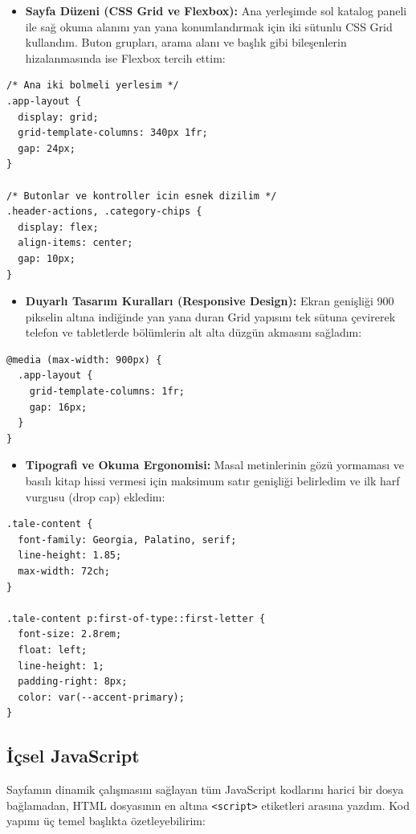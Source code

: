 \documentclass[12pt,a4paper]{article}
\begin{document}
\begin{itemize}
\item \textbf{Sayfa Düzeni (CSS Grid ve Flexbox):} Ana yerleşimde sol katalog paneli ile sağ okuma alanını yan yana konumlandırmak için iki sütunlu CSS Grid kullandım. Buton grupları, arama alanı ve başlık gibi bileşenlerin hizalanmasında ise Flexbox tercih ettim:
\end{itemize}

\begin{lstlisting}[caption={Grid ve Flexbox Yerlesimi}]
/* Ana iki bolmeli yerlesim */
.app-layout {
  display: grid;
  grid-template-columns: 340px 1fr;
  gap: 24px;
}

/* Butonlar ve kontroller icin esnek dizilim */
.header-actions, .category-chips {
  display: flex;
  align-items: center;
  gap: 10px;
}
\end{lstlisting}

\begin{itemize}
\item \textbf{Duyarlı Tasarım Kuralları (Responsive Design):} Ekran genişliği 900 pikselin altına indiğinde yan yana duran Grid yapısını tek sütuna çevirerek telefon ve tabletlerde bölümlerin alt alta düzgün akmasını sağladım:
\end{itemize}

\begin{lstlisting}[caption={Mobil ve Tablet Uyumlu Media Query}]
@media (max-width: 900px) {
  .app-layout {
    grid-template-columns: 1fr;
    gap: 16px;
  }
}
\end{lstlisting}

\begin{itemize}
\item \textbf{Tipografi ve Okuma Ergonomisi:} Masal metinlerinin gözü yormaması ve basılı kitap hissi vermesi için maksimum satır genişliği belirledim ve ilk harf vurgusu (drop cap) ekledim:
\end{itemize}

\begin{lstlisting}[caption={Tipografi ve İlk Harf Vurgusu}]
.tale-content {
  font-family: Georgia, Palatino, serif;
  line-height: 1.85;
  max-width: 72ch;
}

.tale-content p:first-of-type::first-letter {
  font-size: 2.8rem;
  float: left;
  line-height: 1;
  padding-right: 8px;
  color: var(--accent-primary);
}
\end{lstlisting}

\subsection{İçsel JavaScript}
Sayfamın dinamik çalışmasını sağlayan tüm JavaScript kodlarını harici bir dosya bağlamadan, HTML dosyasının en altına \texttt{<script>} etiketleri arasına yazdım. Kod yapımı üç temel başlıkta özetleyebilirim:
\end{document}
